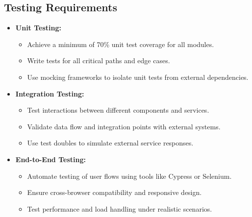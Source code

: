 \subsection{Testing Requirements}
\begin{itemize}[leftmargin=*]
    \item \textbf{Unit Testing:}
    \begin{itemize}
        \item Achieve a minimum of 70\% unit test coverage for all modules.
        \item Write tests for all critical paths and edge cases.
        \item Use mocking frameworks to isolate unit tests from external dependencies.
    \end{itemize}
    
    \item \textbf{Integration Testing:}
    \begin{itemize}
        \item Test interactions between different components and services.
        \item Validate data flow and integration points with external systems.
        \item Use test doubles to simulate external service responses.
    \end{itemize}
    
    \item \textbf{End-to-End Testing:}
    \begin{itemize}
        \item Automate testing of user flows using tools like Cypress or Selenium.
        \item Ensure cross-browser compatibility and responsive design.
        \item Test performance and load handling under realistic scenarios.
    \end{itemize}
\end{itemize}

